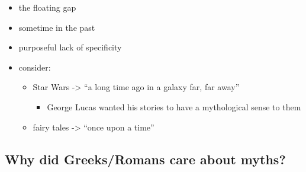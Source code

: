 \documentclass[
  12pt]{findlay}
\providecommand{\tightlist}{%
  \setlength{\itemsep}{0pt}\setlength{\parskip}{0pt}}
\begin{document}
\begin{itemize}
  \begin{itemize}
  \tightlist
  \item
    the floating gap
  \item
    sometime in the past
  \item
    purposeful lack of specificity
  \item
    consider:

    \begin{itemize}
    \tightlist
    \item
      Star Wars -\textgreater{} ``a long time ago in a galaxy far, far
      away''

      \begin{itemize}
      \tightlist
      \item
        George Lucas wanted his stories to have a mythological sense to
        them
      \end{itemize}
    \item
      fairy tales -\textgreater{} ``once upon a time''
    \end{itemize}
  \end{itemize}
\end{itemize}

\hypertarget{why-did-greeksromans-care-about-myths}{%
\subsection{Why did Greeks/Romans care about
myths?}\label{why-did-greeksromans-care-about-myths}}
\end{document}
